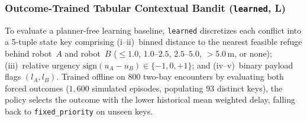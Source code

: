 \subsubsection{Outcome-Trained Tabular Contextual Bandit (\texttt{learned}, L)}
To evaluate a planner-free learning baseline, \texttt{learned} discretizes each conflict into a 5-tuple state key comprising 
(i--ii)~binned distance to the nearest feasible refuge behind robot~$A$ and robot~$B$ ($\le 1.0$, $1.0$--$2.5$, $2.5$--$5.0$, $>5.0$\,m, or none); 
(iii)~relative urgency $\mathrm{sign}(u_A - u_B) \in \{-1, 0, +1\}$; and 
(iv--v)~binary payload flags $(l_A, l_B)$. 
Trained offline on 800 two-bay encounters by evaluating both forced outcomes ($1{,}600$ simulated episodes, populating 93 distinct keys), the policy selects the outcome with the lower historical mean weighted delay, falling back to \texttt{fixed\_priority} on unseen keys.

